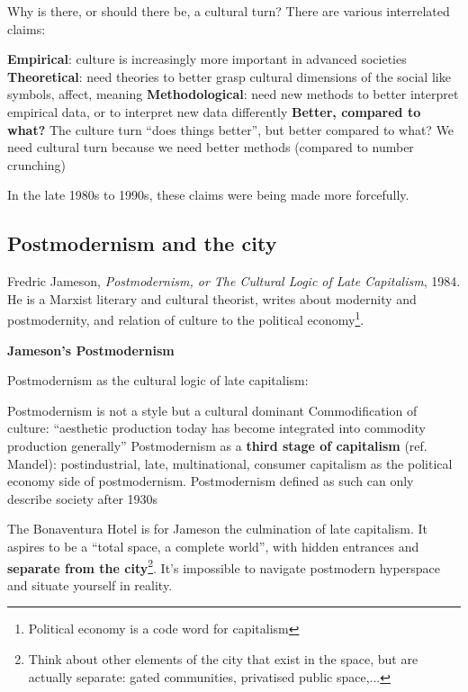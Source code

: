 \documentclass{article}
\begin{document}
Why is there, or should there be, a cultural turn? There are various interrelated claims:

\begin{outline}
	\1 \textbf{Empirical}: culture is increasingly more important in advanced societies
	\1 \textbf{Theoretical}: need theories to better grasp cultural dimensions of the social like symbols, affect, meaning
	\1 \textbf{Methodological}: need new methods to better interpret empirical data, or to interpret new data differently
	\1 \textbf{Better, compared to what?} The culture turn ``does things better'', but better compared to what? We need cultural turn because we need better methods (compared to number crunching)
\end{outline}

In the late 1980s to 1990s, these claims were being made more forcefully.

\subsection{Postmodernism and the city}

Fredric Jameson, \textit{Postmodernism, or The Cultural Logic of Late Capitalism}, 1984. He is a Marxist literary and cultural theorist, writes about modernity and postmodernity, and relation of culture to the political economy\footnote{Political economy is a code word for capitalism}.

\textbf{Jameson's Postmodernism}

Postmodernism as the cultural logic of late capitalism:
\begin{outline}
	\1 Postmodernism is not a style but a cultural dominant
	\1 Commodification of culture: ``aesthetic production today has become integrated into commodity production generally''
	\1 Postmodernism as a \textbf{third stage of capitalism} (ref. Mandel): postindustrial, late, multinational, consumer capitalism as the political economy side of postmodernism. Postmodernism defined as such can only describe society after 1930s
\end{outline}

The Bonaventura Hotel is for Jameson the culmination of late capitalism. It aspires to be a ``total space, a complete world'', with hidden entrances and \textbf{separate from the city}\footnote{Think about other elements of the city that exist in the space, but are actually separate: gated communities, privatised public space,...}. It's impossible to navigate postmodern hyperspace and situate yourself in reality.
\end{document}
